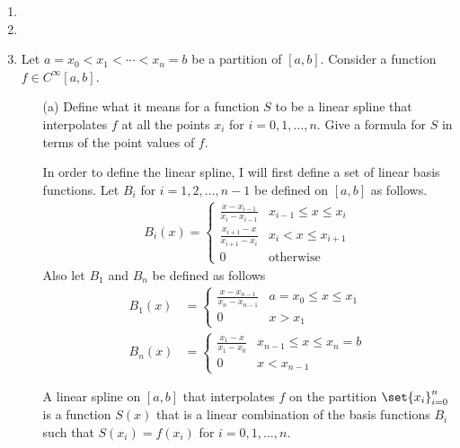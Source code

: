 \documentclass[11pt]{article}
\begin{document}
\begin{enumerate}
    \item %

    \item %

    \item %
        Let $a = x_0 < x_1 < \cdots < x_n = b$ be a partition of $[a, b]$.
        Consider a function $f \in C^{\infty}[a, b]$.
        \begin{enumerate}
            \item[(a)]
                Define what it means for a function $S$ to be a linear spline
                that interpolates $f$ at all the points $x_i$ for
                $i = 0, 1, \ldots, n$.
                Give a formula for $S$ in terms of the point values of $f$.

                In order to define the linear spline, I will first define a set of
                linear basis functions.
                Let $B_i$ for $i = 1, 2, \ldots, n-1$ be defined on $[a, b]$ as follows.
                \begin{align*}
                    B_i(x) = 
                    \begin{cases}
                        \frac{x - x_{i-1}}{x_i - x_{i-1}} & x_{i-1} \le x \le x_i \\
                        \frac{x_{i+1} - x}{x_{i+1} - x_i} & x_i < x \le x_{i+1} \\
                        0 & \text{otherwise}
                    \end{cases}
                \end{align*}
                Also let $B_1$ and $B_n$ be defined as follows
                \begin{align*}
                    B_1(x) &=
                    \begin{cases}
                        \frac{x - x_{n-1}}{x_n - x_{n-1}}& a = x_{0} \le x \le x_1 \\
                        0 & x > x_1
                    \end{cases} \\
                    B_n(x) &=
                    \begin{cases}
                        \frac{x_1 - x}{x_1 - x_0}  & x_{n-1} \le x \le x_n = b \\
                        0 & x < x_{n-1}
                    \end{cases}
                \end{align*}

                A linear spline on $[a, b]$ that interpolates $f$ on the
                partition $\set{x_i}_{i=0}^{n}$ is a function $S(x)$ that is a
                linear combination of the basis functions $B_i$ such that
                $S(x_i) = f(x_i)$ for $i = 0, 1, \ldots, n$.


\end{enumerate}
\end{enumerate}
\end{document}
